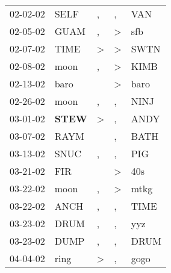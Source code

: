 \begin{supertabular}{p{0.07\textwidth}p{0.06\textwidth}p{0.02\textwidth}p{0.02\textwidth}p{0.06\textwidth}}
 02-02-02\textsuperscript{} &           SELF\textsuperscript{} &                , &                , &            VAN\textsuperscript{} \\
 02-05-02\textsuperscript{} &           GUAM\textsuperscript{} &                , &     \textgreater &            sfb\textsuperscript{} \\
 02-07-02\textsuperscript{} &           TIME\textsuperscript{} &     \textgreater &     \textgreater &           SWTN\textsuperscript{} \\
 02-08-02\textsuperscript{} &           moon\textsuperscript{} &                , &     \textgreater &           KIMB\textsuperscript{} \\
 02-13-02\textsuperscript{} &           baro\textsuperscript{} &                  &     \textgreater &           baro\textsuperscript{} \\
 02-26-02\textsuperscript{} &           moon\textsuperscript{} &                , &                , &           NINJ\textsuperscript{} \\
 03-01-02\textsuperscript{} &  \textbf{STEW\textsuperscript{}} &     \textgreater &                , &           ANDY\textsuperscript{} \\
 03-07-02\textsuperscript{} &           RAYM\textsuperscript{} &                  &                , &           BATH\textsuperscript{} \\
 03-13-02\textsuperscript{} &           SNUC\textsuperscript{} &                , &                , &            PIG\textsuperscript{} \\
 03-21-02\textsuperscript{} &            FIR\textsuperscript{} &                  &     \textgreater &            40s\textsuperscript{} \\
 03-22-02\textsuperscript{} &           moon\textsuperscript{} &                , &     \textgreater &           mtkg\textsuperscript{} \\
 03-22-02\textsuperscript{} &           ANCH\textsuperscript{} &                , &                , &           TIME\textsuperscript{} \\
 03-23-02\textsuperscript{} &           DRUM\textsuperscript{} &                , &                , &            yyz\textsuperscript{} \\
 03-23-02\textsuperscript{} &           DUMP\textsuperscript{} &                , &                , &           DRUM\textsuperscript{} \\
 04-04-02\textsuperscript{} &           ring\textsuperscript{} &     \textgreater &                , &           gogo\textsuperscript{} \\

\end{supertabular}
